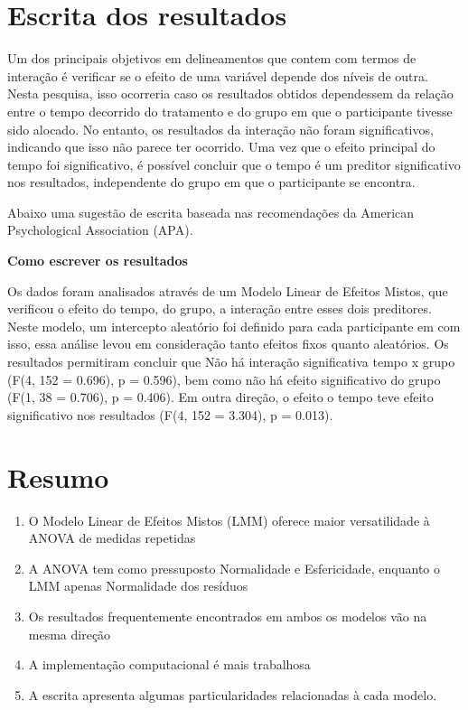 \documentclass[
]{book}
\providecommand{\tightlist}{%
  \setlength{\itemsep}{0pt}\setlength{\parskip}{0pt}}
\begin{document}
\hypertarget{escrita-dos-resultados-11}{%
\section{Escrita dos resultados}\label{escrita-dos-resultados-11}}

Um dos principais objetivos em delineamentos que contem com termos de interação é verificar se o efeito de uma variável depende dos níveis de outra. Nesta pesquisa, isso ocorreria caso os resultados obtidos dependessem da relação entre o tempo decorrido do tratamento e do grupo em que o participante tivesse sido alocado. No entanto, os resultados da interação não foram significativos, indicando que isso não parece ter ocorrido. Uma vez que o efeito principal do tempo foi significativo, é possível concluir que o tempo é um preditor significativo nos resultados, independente do grupo em que o participante se encontra.

Abaixo uma sugestão de escrita baseada nas recomendações da American Psychological Association (APA).

\textbf{Como escrever os resultados}

Os dados foram analisados através de um Modelo Linear de Efeitos Mistos, que verificou o efeito do tempo, do grupo, a interação entre esses dois preditores. Neste modelo, um intercepto aleatório foi definido para cada participante em com isso, essa análise levou em consideração tanto efeitos fixos quanto aleatórios. Os resultados permitiram concluir que Não há interação significativa tempo x grupo (F(4, 152 = 0.696), p = 0.596), bem como não há efeito significativo do grupo (F(1, 38 = 0.706), p = 0.406). Em outra direção, o efeito o tempo teve efeito significativo nos resultados (F(4, 152 = 3.304), p = 0.013).

\hypertarget{resumo-13}{%
\section{Resumo}\label{resumo-13}}

\begin{enumerate}
\def\labelenumi{\arabic{enumi}.}
\tightlist
\item
  O Modelo Linear de Efeitos Mistos (LMM) oferece maior versatilidade à ANOVA de medidas repetidas\\
\item
  A ANOVA tem como pressuposto Normalidade e Esfericidade, enquanto o LMM apenas Normalidade dos resíduos
\item
  Os resultados frequentemente encontrados em ambos os modelos vão na mesma direção\\
\item
  A implementação computacional é mais trabalhosa\\
\item
  A escrita apresenta algumas particularidades relacionadas à cada modelo.\\
\end{enumerate}
\end{document}
